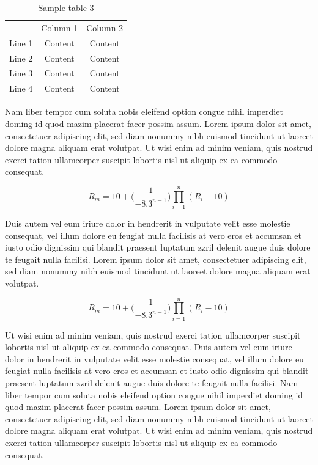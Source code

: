 \documentclass[11pt, a4paper, twoside]{report}
\begin{document}
\begin{table}[H]
  \centering
  \begin{tabular}{c c@{\hskip 1in} c} 
    & Column 1 & Column 2  \\ [0.5ex] 
    Line 1 & Content & Content \\ 
    Line 2 & Content & Content \\
    Line 3 & Content & Content \\
    Line 4 & Content & Content \\ [1ex] 
  \end{tabular}
  \captionsetup{font=bf, belowskip=-0.5cm}
  \caption[Sample table 3]{Sample table 3}
  \label{table:tab_3}
\end{table}

Nam liber tempor cum soluta nobis eleifend option congue nihil imperdiet doming id quod mazim placerat facer possim assum. Lorem ipsum dolor sit amet, consectetuer adipiscing elit, sed diam nonummy nibh euismod tincidunt ut laoreet dolore magna aliquam erat volutpat. Ut wisi enim ad minim veniam, quis nostrud exerci tation ullamcorper suscipit lobortis nisl ut aliquip ex ea commodo consequat.

\begin{equation}
	R_m = 10 + \Big(\frac{1}{-8.3^{n-1}}\Big) \displaystyle\prod_{i=1}^{n} (R_i-10)
	\label{eq:eq_2}
\end{equation}

Duis autem vel eum iriure dolor in hendrerit in vulputate velit esse molestie consequat, vel illum dolore eu feugiat nulla facilisis at vero eros et accumsan et iusto odio dignissim qui blandit praesent luptatum zzril delenit augue duis dolore te feugait nulla facilisi. Lorem ipsum dolor sit amet, consectetuer adipiscing elit, sed diam nonummy nibh euismod tincidunt ut laoreet dolore magna aliquam erat volutpat. 

\begin{equation}
	R_m = 10 + \Big(\frac{1}{-8.3^{n-1}}\Big) \displaystyle\prod_{i=1}^{n} (R_i-10)
	\label{eq:eq_3}
\end{equation}

Ut wisi enim ad minim veniam, quis nostrud exerci tation ullamcorper suscipit lobortis nisl ut aliquip ex ea commodo consequat. Duis autem vel eum iriure dolor in hendrerit in vulputate velit esse molestie consequat, vel illum dolore eu feugiat nulla facilisis at vero eros et accumsan et iusto odio dignissim qui blandit praesent luptatum zzril delenit augue duis dolore te feugait nulla facilisi.
Nam liber tempor cum soluta nobis eleifend option congue nihil imperdiet doming id quod mazim placerat facer possim assum. Lorem ipsum dolor sit amet, consectetuer adipiscing elit, sed diam nonummy nibh euismod tincidunt ut laoreet dolore magna aliquam erat volutpat. Ut wisi enim ad minim veniam, quis nostrud exerci tation ullamcorper suscipit lobortis nisl ut aliquip ex ea commodo consequat.
\end{document}
